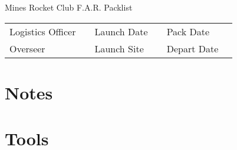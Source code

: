 \documentclass[12pt]{article}
\newcommand{\hfield}{\framebox[30mm]{\rule{0pt}{5mm}}}
\begin{document}
\pagestyle{fancy}
{\centering \Large Mines Rocket Club F.A.R. Packlist}\newline
\begin{tabular}{lclclc}
	Logistics Officer & \hfield & Launch Date & \hfield & Pack Date & \hfield\\
	Overseer          & \hfield & Launch Site & \hfield & Depart Date & \hfield\\
\end{tabular}
\section*{Notes}
\framebox[9.5in]{\rule{0pt}{4in}}
\clearpage
\section{Tools}
\end{document}
